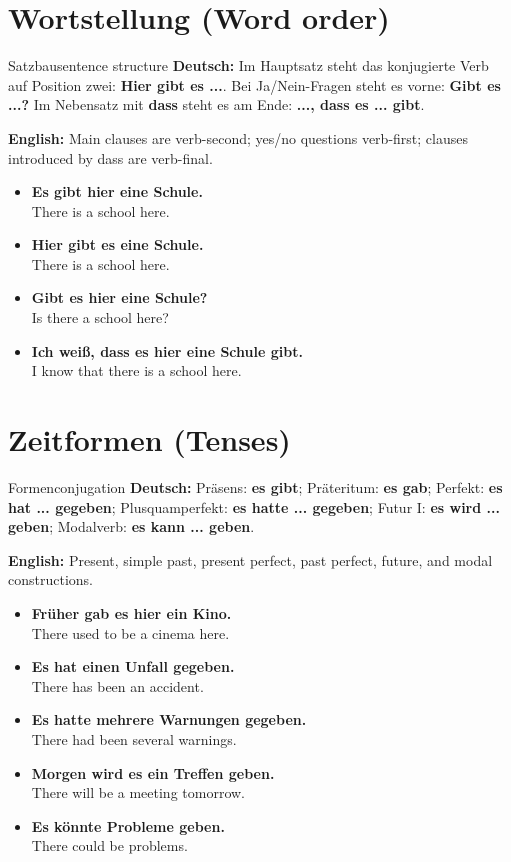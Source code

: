 \documentclass[a4paper,11pt]{article}
\newcommand{\GermanText}[1]{\textbf{Deutsch: }#1\par}
\newcommand{\EnglishText}[1]{{\small\color{SoftGray}\textbf{English: }#1\par}}
\newcommand{\ExampleItem}[2]{\item \textbf{#1}\\{\small\color{SoftGray}#2}}
\begin{document}
\section{Wortstellung (Word order)}
\begin{grammarentry}{Satzbau}{sentence structure}
\GermanText{Im Hauptsatz steht das konjugierte Verb auf Position zwei: \textbf{Hier gibt es ...}. Bei Ja/Nein-Fragen steht es vorne: \textbf{Gibt es ...?} Im Nebensatz mit \textbf{dass} steht es am Ende: \textbf{..., dass es ... gibt}.}
\EnglishText{Main clauses are verb-second; yes/no questions verb-first; clauses introduced by dass are verb-final.}
\end{grammarentry}
\begin{exbox}\begin{itemize}
\ExampleItem{Es gibt hier eine Schule.}{There is a school here.}
\ExampleItem{Hier gibt es eine Schule.}{There is a school here.}
\ExampleItem{Gibt es hier eine Schule?}{Is there a school here?}
\ExampleItem{Ich weiß, dass es hier eine Schule gibt.}{I know that there is a school here.}
\end{itemize}\end{exbox}
\section{Zeitformen (Tenses)}
\begin{grammarentry}{Formen}{conjugation}
\GermanText{Präsens: \textbf{es gibt}; Präteritum: \textbf{es gab}; Perfekt: \textbf{es hat ... gegeben}; Plusquamperfekt: \textbf{es hatte ... gegeben}; Futur I: \textbf{es wird ... geben}; Modalverb: \textbf{es kann ... geben}.}
\EnglishText{Present, simple past, present perfect, past perfect, future, and modal constructions.}
\end{grammarentry}
\begin{exbox}\begin{itemize}
\ExampleItem{Früher gab es hier ein Kino.}{There used to be a cinema here.}
\ExampleItem{Es hat einen Unfall gegeben.}{There has been an accident.}
\ExampleItem{Es hatte mehrere Warnungen gegeben.}{There had been several warnings.}
\ExampleItem{Morgen wird es ein Treffen geben.}{There will be a meeting tomorrow.}
\ExampleItem{Es könnte Probleme geben.}{There could be problems.}
\end{itemize}\end{exbox}
\end{document}
